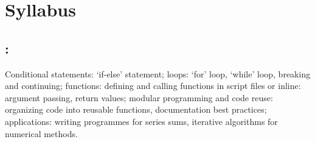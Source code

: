 \section*{Syllabus}

    \subsection*{\topicSubTitle: \topicTitle}
        Conditional statements: `if-else' statement; loops: `for' loop, `while' loop, breaking and continuing; functions: defining and calling functions in script files or inline: argument passing, return values; modular programming and code reuse: organizing code into reusable functions, documentation best practices; applications: writing programmes for series sums, iterative algorithms for numerical methods.